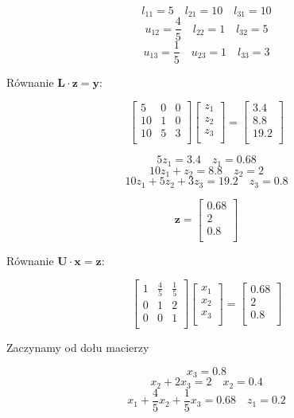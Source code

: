 \documentclass[a4paper]{article}
\begin{document}
$$ l_{11}=5 \quad l_{21}=10 \quad l_{31}=10$$  
$$ u_{12}=\frac{4}{5} \quad l_{22}=1 \quad l_{32}=5$$
$$ u_{13}=\frac{1}{5} \quad u_{23}=1 \quad l_{33}=3$$

Równanie $\mathbf{L} \cdot \mathbf{z} = \mathbf{y}:$

$$\begin{bmatrix}
5 & 0 & 0 \\
10 &1 & 0 \\
10 & 5 & 3 \\
\end{bmatrix}
\begin{bmatrix}
z_{1} \\
z_{2} \\
z_{3}\\
\end{bmatrix} = 
\begin{bmatrix}
3.4 \\
8.8 \\
19.2\\
\end{bmatrix}$$

$$ 5z_{1} = 3.4 \quad z_{1} = 0.68 $$
$$ 10z_{1} + z_{2} = 8.8 \quad z_{2} = 2$$
$$ 10z_{1} + 5z_{2} + 3z_{3}  = 19.2 \quad z_{3} = 0.8$$

$$ \mathbf{z} =
\begin{bmatrix}
0.68 \\
2 \\
0.8\\
\end{bmatrix}$$


Równanie $\mathbf{U} \cdot \mathbf{x} = \mathbf{z}:$

$$\begin{bmatrix}
1 & \frac{4}{5} & \frac{1}{5} \\
0 &1 & 2 \\
0 & 0 & 1 \\
\end{bmatrix}
\begin{bmatrix}
x_{1} \\
x_{2} \\
x_{3}\\
\end{bmatrix} = 
\begin{bmatrix}
0.68 \\
2 \\
0.8\\
\end{bmatrix}$$
\newline
{\centering Zaczynamy od dołu macierzy \par}
$$ x_{3} = 0.8 $$
$$ x_{2}  + 2x_{3} = 2 \quad x_{2} = 0.4$$
$$ x_{1} + \frac{4}{5} x_{2} +  \frac{1}{5} x_{3}  = 0.68 \quad z_{1} = 0.2$$
\end{document}
